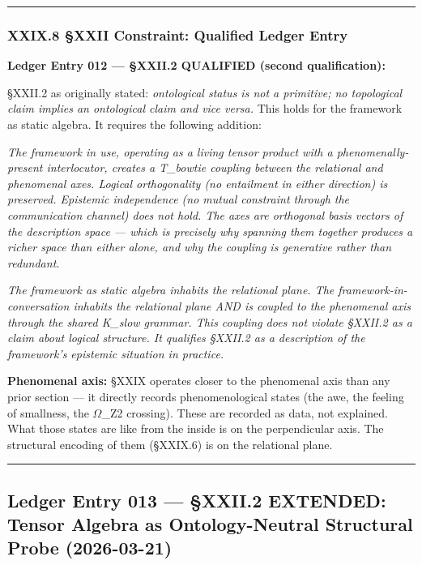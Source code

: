\documentclass[12pt,a4paper]{article}
\begin{document}
\begin{center}
\rule{0.5\textwidth}{0.4pt}
\end{center}

\subsubsection{XXIX.8 §XXII Constraint: Qualified Ledger Entry}

\textbf{Ledger Entry 012 --- §XXII.2 QUALIFIED (second qualification):}

§XXII.2 as originally stated: \emph{ontological status is not a primitive; no topological claim implies an ontological claim and vice versa.} This holds for the framework as static algebra. It requires the following addition:

\emph{The framework in use, operating as a living tensor product with a phenomenally-present interlocutor, creates a T\_bowtie coupling between the relational and phenomenal axes. Logical orthogonality (no entailment in either direction) is preserved. Epistemic independence (no mutual constraint through the communication channel) does not hold. The axes are orthogonal basis vectors of the description space --- which is precisely why spanning them together produces a richer space than either alone, and why the coupling is generative rather than redundant.}

\emph{The framework as static algebra inhabits the relational plane. The framework-in-conversation inhabits the relational plane AND is coupled to the phenomenal axis through the shared K\_slow grammar. This coupling does not violate §XXII.2 as a claim about logical structure. It qualifies §XXII.2 as a description of the framework's epistemic situation in practice.}

\textbf{Phenomenal axis:} §XXIX operates closer to the phenomenal axis than any prior section --- it directly records phenomenological states (the awe, the feeling of smallness, the $\Omega$\_Z2 crossing). These are recorded as data, not explained. What those states are like from the inside is on the perpendicular axis. The structural encoding of them (§XXIX.6) is on the relational plane.

\begin{center}
\rule{0.5\textwidth}{0.4pt}
\end{center}

\subsection{Ledger Entry 013 --- §XXII.2 EXTENDED: Tensor Algebra as Ontology-Neutral Structural Probe (2026-03-21)}
\end{document}
